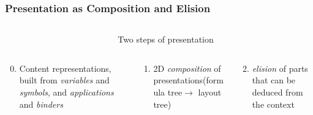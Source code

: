 \documentclass[pdftex,xcolor=svgnames]{beamer}
\begin{document}
\begin{frame}
  \frametitle{Presentation as Composition and Elision}

  \begin{columns}
    \begin{column}{.33\textwidth}
    \end{column}
    \begin{column}{.67\textwidth}
      \centering
      Two steps of presentation
    \end{column}
  \end{columns}
  \begin{columns}[T]
    \begin{column}{.33\textwidth}
      \scriptsize\begin{enumerate}
        \setcounter{enumi}{-1}
      \item Content representations, built from \emph{variables} and
      \emph{symbols}, and \emph{applications} and \emph{binders}
      \end{enumerate}
    \end{column}
    \begin{column}{.33\textwidth}
      \scriptsize\begin{enumerate}
      \item 2D \emph{composition} of presentations\newline (formula tree\newline $\to$
        layout tree)
      \end{enumerate}
    \end{column}
    \begin{column}{.33\textwidth}
      \scriptsize\begin{enumerate}
        \setcounter{enumi}{1}
      \item \emph{elision} of parts that can be deduced from the context
      \end{enumerate}
    \end{column}
  \end{columns}
  \begin{columns}
    \begin{column}{.33\textwidth}
      \centering
\end{column}
\end{columns}
\end{frame}
\end{document}

